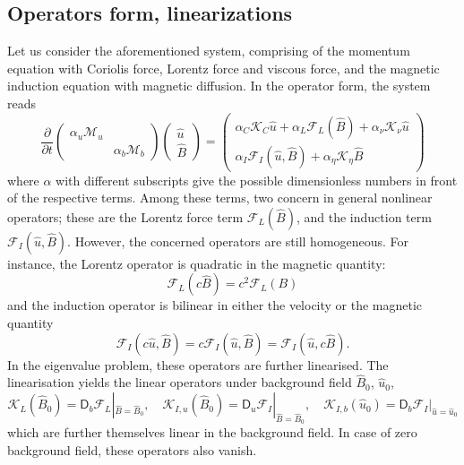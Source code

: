 \subsection{Operators form, linearizations}

Let us consider the aforementioned system, comprising of the momentum equation with Coriolis force, Lorentz force and viscous force, and the magnetic induction equation with magnetic diffusion. In the operator form, the system reads
\begin{equation}
    \frac{\partial}{\partial t} \begin{pmatrix} \alpha_u \mathcal{M}_u & \\ & \alpha_b \mathcal{M}_b \end{pmatrix}
    \begin{pmatrix} \hat{u} \\ \hat{B} \end{pmatrix} = 
    \begin{pmatrix}
        \alpha_C \mathcal{K}_C \hat{u} + \alpha_L \mathcal{F}_{L}(\hat{B}) + \alpha_\nu \mathcal{K}_\nu \hat{u} \\ 
        \alpha_I \mathcal{F}_{I}(\hat{u}, \hat{B}) + \alpha_\eta \mathcal{K}_\eta \hat{B}
    \end{pmatrix}
\end{equation}
where $\alpha$ with different subscripts give the possible dimensionless numbers in front of the respective terms. Among these terms, two concern in general nonlinear operators; these are the Lorentz force term $\mathcal{F}_L(\hat{B})$, and the induction term $\mathcal{F}_I(\hat{u}, \hat{B})$. However, the concerned operators are still homogeneous. For instance, the Lorentz operator is quadratic in the magnetic quantity:
\[
    \mathcal{F}_L(c\hat{B}) = c^2 \mathcal{F}_L(B)
\]
and the induction operator is bilinear in either the velocity or the magnetic quantity
\[
    \mathcal{F}_I(c\hat{u}, \hat{B}) = c \mathcal{F}_I(\hat{u}, \hat{B}) = \mathcal{F}_I(\hat{u}, c\hat{B}).
\]
In the eigenvalue problem, these operators are further linearised. The linearisation yields the linear operators under background field $\hat{B}_0$, $\hat{u}_0$,
\[
    \mathcal{K}_L(\hat{B}_0) = \mathsf{D}_b \mathcal{F}_L|_{\hat{B} = \hat{B}_0},\quad 
    \mathcal{K}_{I,u}(\hat{B}_0) = \mathsf{D}_u \mathcal{F}_I|_{\hat{B} = \hat{B}_0},\quad 
    \mathcal{K}_{I,b}(\hat{u}_0) = \mathsf{D}_b \mathcal{F}_I|_{\hat{u} = \hat{u}_0}
\]
which are further themselves linear in the background field. In case of zero background field, these operators also vanish.
